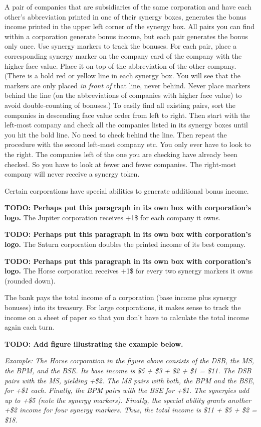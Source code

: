 \documentclass[10pt,final]{report}
\begin{document}
\begin{multicols}{2}
A pair of companies that are subsidiaries of the same corporation and
have each other's abbreviation printed in one of their synergy boxes,
generates the bonus income printed in the upper left corner of the
synergy box. All pairs you can find within a corporation generate
bonus income, but each pair generates the bonus only once. Use synergy
markers to track the bonuses. For each pair, place a corresponding
synergy marker on the company card of the company with the higher face
value. Place it on top of the abbreviation of the other
company. (There is a bold red or yellow line in each synergy box. You
will see that the markers are only placed \emph{in front of} that
line, never behind. Never place markers behind the line (on the
abbreviations of companies with higher face value) to avoid
double-counting of bonuses.) To easily find all existing pairs, sort
the companies in descending face value order from left to right. Then
start with the left-most company and check all the companies listed in
its synergy boxes until you hit the bold line. No need to check behind
the line. Then repeat the procedure with the second left-most company
etc. You only ever have to look to the right. The companies left of
the one you are checking have already been checked. So you have to
look at fewer and fewer companies. The right-most company will never
receive a synergy token.

Certain corporations have special abilities to generate additional
bonus income.

\textbf{TODO: Perhaps put this paragraph in its own box with
  corporation's logo.} The Jupiter corporation receives +1\$ for each
company it owns.

\textbf{TODO: Perhaps put this paragraph in its own box with
  corporation's logo.} The Saturn corporation doubles the printed
income of its best company.

\textbf{TODO: Perhaps put this paragraph in its own box with
  corporation's logo.} The Horse corporation receives +1\$ for every
two synergy markers it owns (rounded down).

The bank pays the total income of a corporation (base income plus
synergy bonuses) into its treasury. For large corporations, it makes
sense to track the income on a sheet of paper so that you don't have
to calculate the total income again each turn.

\textbf{TODO: Add figure illustrating the example below.}

\emph{Example: The Horse corporation in the figure above consists of
  the DSB, the MS, the BPM, and the BSE. Its base income is \$5 + \$3
  + \$2 + \$1 = \$11. The DSB pairs with the MS, yielding +\$2. The MS
  pairs with both, the BPM and the BSE, for +\$1 each. Finally, the
  BPM pairs with the BSE for +\$1. The synergies add up to +\$5 (note
  the synergy markers). Finally, the special ability grants another
  +\$2 income for four synergy markers. Thus, the total income is \$11
  + \$5 + \$2 = \$18.}


\end{multicols}
\end{document}
